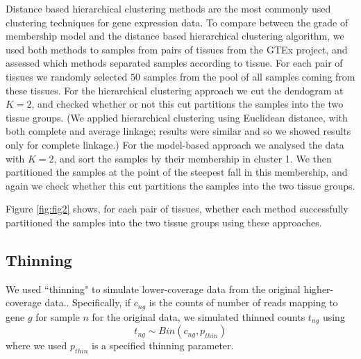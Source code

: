 Distance based hierarchical clustering methods are the most commonly used clustering techniques for gene expression data. To compare between the grade of membership model and the distance based hierarchical clustering algorithm, we used both methods to samples from pairs of tissues from the GTEx project, and assessed 
which methods separated samples according to tissue.  For each pair of tissues  we randomly selected $50$ samples from the pool of all samples coming from these tissues. 
For the hierarchical clustering approach we cut the dendogram at $K=2$, and checked whether or not this cut partitions the samples into the two tissue groups. 
(We applied hierarchical clustering using Euclidean distance, with both complete and average linkage; results were similar and so we showed results only for complete linkage.) 
For the model-based approach we analysed the data with $K=2$, and sort the samples by their membership in cluster 1. We then partitioned the samples at the point of the steepest fall in this membership, and again we check whether this cut partitions the samples into the two tissue groups.

Figure \ref{fig:fig2} shows, for each pair of tissues, whether each method successfully partitioned the samples into the two tissue groups using these approaches.
%


\subsection{Thinning}

We used ``thinning" to simulate lower-coverage data from the original higher-coverage data.. 
Specifically, if $c_{ng}$ is the counts of number of reads mapping to gene $g$ for sample $n$ for the original data, we simulated 
thinned counts $t_{ng}$ using 
\begin{equation}
t_{ng} \sim Bin (c_{ng}, p_{thin})
\end{equation}
where we used $p_{thin}$ is a specified thinning parameter.


